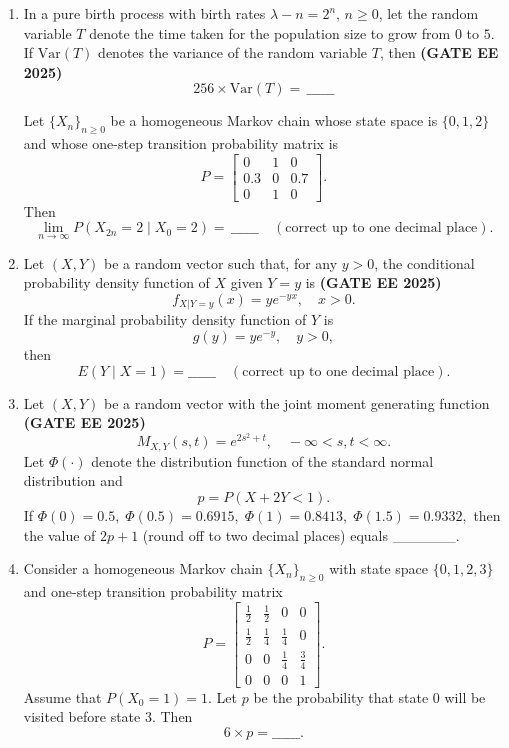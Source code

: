 \documentclass[journal,12pt,onecolumn]{IEEEtran}
\theoremstyle{remark}
\begin{document}
\begin{enumerate}
\item In a pure birth process with birth rates $\lambda-n = 2^n, \, n \geq 0$, let the random variable $T$ denote the time taken for the population size to grow from $0$ to $5$. If $\text{Var}(T)$ denotes the variance of the random variable $T$, then \hfill \textbf{(GATE EE 2025)}
\[
256 \times \text{Var}(T) = \, \_\_\_\_\_\_
\]

Let $\{X_n\}_{n \geq 0}$ be a homogeneous Markov chain whose state space is $\{0,1,2\}$ and whose one-step transition probability matrix is 
\[
P = \begin{bmatrix}
0 & 1 & 0 \\
0.3 & 0 & 0.7 \\
0 & 1 & 0 
\end{bmatrix}.
\]
Then 
\[
\lim_{n \to \infty} P(X_{2n} = 2 \mid X_0 = 2) = \, \_\_\_\_\_\_ \quad (\text{correct up to one decimal place}).
\]

\item Let $(X,Y)$ be a random vector such that, for any $y>0$, the conditional probability density function of $X$ given $Y=y$ is \hfill \textbf{(GATE EE 2025)}
\[
f_{X|Y=y}(x) = y e^{-yx}, \quad x>0.
\]
If the marginal probability density function of $Y$ is 
\[
g(y) = y e^{-y}, \quad y>0,
\]
then 
\[
E(Y \mid X=1) = \_\_\_\_\_\_ \quad (\text{correct up to one decimal place}).
\]

\item Let $(X,Y)$ be a random vector with the joint moment generating function  \hfill \textbf{(GATE EE 2025)}
\[
M_{X,Y}(s,t) = e^{2s^2 + t}, \quad -\infty < s,t < \infty.
\]
Let $\Phi(\cdot)$ denote the distribution function of the standard normal distribution and 
\[
p = P(X+2Y < 1).
\] 
If $\Phi(0) = 0.5, \; \Phi(0.5) = 0.6915, \; \Phi(1) = 0.8413, \; \Phi(1.5) = 0.9332,$ then the value of $2p+1$ (round off to two decimal places) equals \_\_\_\_\_\_.

\item Consider a homogeneous Markov chain $\{X_n\}_{n \geq 0}$ with state space $\{0,1,2,3\}$ and one-step transition probability matrix
\[
P = \begin{bmatrix}
\frac{1}{2} & \frac{1}{2} & 0 & 0 \\
\frac{1}{2} & \frac{1}{4} & \frac{1}{4} & 0 \\
0 & 0 & \frac{1}{4} & \frac{3}{4} \\
0 & 0 & 0 & 1
\end{bmatrix}.
\]
Assume that $P(X_0 = 1) = 1$. Let $p$ be the probability that state $0$ will be visited before state $3$. Then 
\[
6 \times p = \_\_\_\_\_\_.
\]


\end{enumerate}
\end{document}
